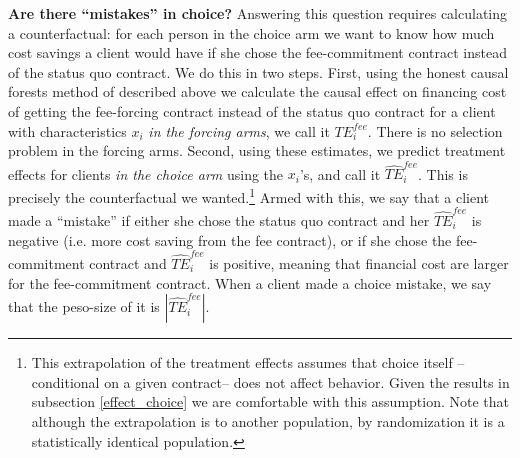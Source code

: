 \documentclass[11pt]{article}
\begin{document}
\vspace{.2in}
\noindent \textbf{Are there ``mistakes'' in choice?} Answering this question requires calculating a counterfactual: for each person in the choice arm we want to know how much cost savings a client would have if she chose the fee-commitment contract instead of the status quo contract. We do this in two steps. First, using the honest causal forests method of \cite{atheygrf} described above we calculate the causal effect on financing cost of getting the fee-forcing contract instead of the status quo contract for a client with characteristics $x_i$ \textit{in the forcing arms}, we call it $TE^{fee}_{i}$. There is no selection problem in the forcing arms. Second, using these estimates, we predict treatment effects for clients \textit{in the choice arm} using the $x_i$'s, and call it $\widehat{TE}^{fee}_{i}$. This is precisely the counterfactual we wanted.\footnote{This extrapolation of the treatment effects assumes that choice itself --conditional on a given contract-- does not affect behavior. Given the results in subsection \ref{effect_choice} we are comfortable with this assumption. Note that although the extrapolation is to another population, by randomization it is a statistically identical population.} Armed with this, we say that a client made a ``mistake'' if either she chose the status quo contract and her $\widehat{TE}^{fee}_{i}$ is negative (i.e. more cost saving from the fee contract), or if she chose the fee-commitment contract and $\widehat{TE}^{fee}_{i}$ is positive, meaning that financial cost are larger for the fee-commitment contract. When a client made a choice mistake, we say that the peso-size of it is $|\widehat{TE}^{fee}_{i}|$. 


\end{document}

